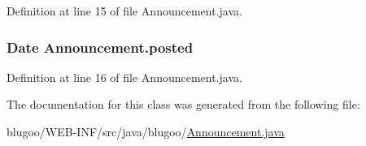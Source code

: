 Definition at line 15 of file Announcement.java.\hypertarget{classAnnouncement_2a465f65c7d03a23ccd84278e0a64577}{
\subsubsection{\setlength{\rightskip}{0pt plus 5cm}Date {\bf Announcement.posted}}}
\label{classAnnouncement_2a465f65c7d03a23ccd84278e0a64577}




Definition at line 16 of file Announcement.java.

The documentation for this class was generated from the following file:\begin{CompactItemize}
\item 
blugoo/WEB-INF/src/java/blugoo/\hyperlink{Announcement_8java}{Announcement.java}\end{CompactItemize}

